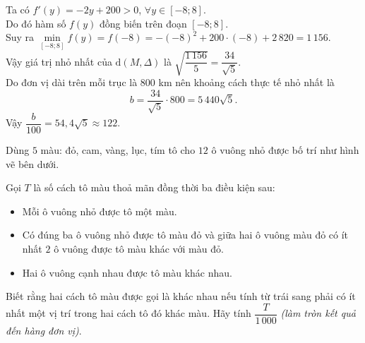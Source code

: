\begin{ex}
{		Ta có $f'(y) = -2y + 200 > 0$, $\forall y \in [-8;8]$.\\
		Do đó hàm số $f(y)$ đồng biến trên đoạn $[-8;8]$.\\
		Suy ra $\min\limits_{[-8;8]} f(y) = f(-8) = -(-8)^2 + 200\cdot (-8) + 2\,820 = 1\,156$.\\
		Vậy giá trị nhỏ nhất của $\mathrm{d}(M, \Delta)$ là $\sqrt{\dfrac{1\,156}{5}}=\dfrac{34}{\sqrt{5}}$.\\
		Do đơn vị dài trên mỗi trục là $800$ km nên khoảng cách thực tế nhỏ nhất là
		\[ b = \dfrac{34}{\sqrt{5}} \cdot 800 = 5\,440\sqrt{5}. \]
		Vậy $\dfrac{b}{100} = 54{,}4\sqrt{5} \approx 122$.
	}
\end{ex}

\begin{ex}%
	Dùng $5$ màu: đỏ, cam, vàng, lục, tím tô cho $12$ ô vuông nhỏ được bố trí như hình vẽ bên dưới.
	\begin{center}
	\end{center}
	Gọi $T$ là số cách tô màu thoả mãn đồng thời ba điều kiện sau:
	\begin{itemize}
		\item Mỗi ô vuông nhỏ được tô một màu.
		\item Có đúng ba ô vuông nhỏ được tô màu đỏ và giữa hai ô vuông màu đỏ có ít nhất $2$ ô vuông được tô màu khác với màu đỏ.
		\item Hai ô vuông cạnh nhau được tô màu khác nhau.
	\end{itemize}
	Biết rằng hai cách tô màu được gọi là khác nhau nếu tính từ trái sang phải có ít nhất một vị trí trong hai cách tô đó khác màu. Hãy tính $\dfrac{T}{1\,000}$ \textit{(làm tròn kết quả đến hàng đơn vị)}.
	\par
\end{ex}

